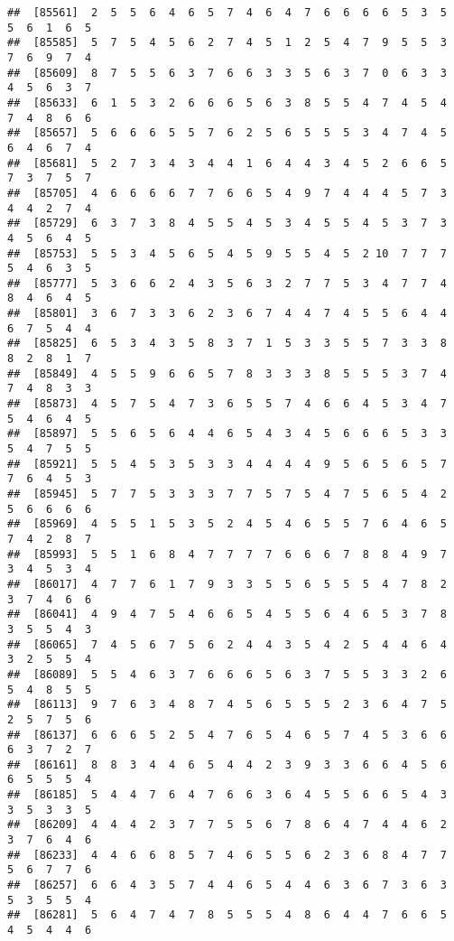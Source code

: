 \documentclass[
]{book}
\begin{document}
\begin{verbatim}
##  [85561]  2  5  5  6  4  6  5  7  4  6  4  7  6  6  6  6  5  3  5  5  6  1  6  5
##  [85585]  5  7  5  4  5  6  2  7  4  5  1  2  5  4  7  9  5  5  3  7  6  9  7  4
##  [85609]  8  7  5  5  6  3  7  6  6  3  3  5  6  3  7  0  6  3  3  4  5  6  3  7
##  [85633]  6  1  5  3  2  6  6  6  5  6  3  8  5  5  4  7  4  5  4  7  4  8  6  6
##  [85657]  5  6  6  6  5  5  7  6  2  5  6  5  5  5  3  4  7  4  5  6  4  6  7  4
##  [85681]  5  2  7  3  4  3  4  4  1  6  4  4  3  4  5  2  6  6  5  7  3  7  5  7
##  [85705]  4  6  6  6  6  7  7  6  6  5  4  9  7  4  4  4  5  7  3  4  4  2  7  4
##  [85729]  6  3  7  3  8  4  5  5  4  5  3  4  5  5  4  5  3  7  3  4  5  6  4  5
##  [85753]  5  5  3  4  5  6  5  4  5  9  5  5  4  5  2 10  7  7  7  5  4  6  3  5
##  [85777]  5  3  6  6  2  4  3  5  6  3  2  7  7  5  3  4  7  7  4  8  4  6  4  5
##  [85801]  3  6  7  3  3  6  2  3  6  7  4  4  7  4  5  5  6  4  4  6  7  5  4  4
##  [85825]  6  5  3  4  3  5  8  3  7  1  5  3  3  5  5  7  3  3  8  8  2  8  1  7
##  [85849]  4  5  5  9  6  6  5  7  8  3  3  3  8  5  5  5  3  7  4  7  4  8  3  3
##  [85873]  4  5  7  5  4  7  3  6  5  5  7  4  6  6  4  5  3  4  7  5  4  6  4  5
##  [85897]  5  5  6  5  6  4  4  6  5  4  3  4  5  6  6  6  5  3  3  5  4  7  5  5
##  [85921]  5  5  4  5  3  5  3  3  4  4  4  4  9  5  6  5  6  5  7  7  6  4  5  3
##  [85945]  5  7  7  5  3  3  3  7  7  5  7  5  4  7  5  6  5  4  2  5  6  6  6  6
##  [85969]  4  5  5  1  5  3  5  2  4  5  4  6  5  5  7  6  4  6  5  7  4  2  8  7
##  [85993]  5  5  1  6  8  4  7  7  7  7  6  6  6  7  8  8  4  9  7  3  4  5  3  4
##  [86017]  4  7  7  6  1  7  9  3  3  5  5  6  5  5  5  4  7  8  2  3  7  4  6  6
##  [86041]  4  9  4  7  5  4  6  6  5  4  5  5  6  4  6  5  3  7  8  3  5  5  4  3
##  [86065]  7  4  5  6  7  5  6  2  4  4  3  5  4  2  5  4  4  6  4  3  2  5  5  4
##  [86089]  5  5  4  6  3  7  6  6  6  5  6  3  7  5  5  3  3  2  6  5  4  8  5  5
##  [86113]  9  7  6  3  4  8  7  4  5  6  5  5  5  2  3  6  4  7  5  2  5  7  5  6
##  [86137]  6  6  6  5  2  5  4  7  6  5  4  6  5  7  4  5  3  6  6  6  3  7  2  7
##  [86161]  8  8  3  4  4  6  5  4  4  2  3  9  3  3  6  6  4  5  6  6  5  5  5  4
##  [86185]  5  4  4  7  6  4  7  6  6  3  6  4  5  5  6  6  5  4  3  3  5  3  3  5
##  [86209]  4  4  4  2  3  7  7  5  5  6  7  8  6  4  7  4  4  6  2  3  7  6  4  6
##  [86233]  4  4  6  6  8  5  7  4  6  5  5  6  2  3  6  8  4  7  7  5  6  7  7  6
##  [86257]  6  6  4  3  5  7  4  4  6  5  4  4  6  3  6  7  3  6  3  5  3  5  5  4
##  [86281]  5  6  4  7  4  7  8  5  5  5  4  8  6  4  4  7  6  6  5  4  5  4  4  6

\end{verbatim}
\end{document}
